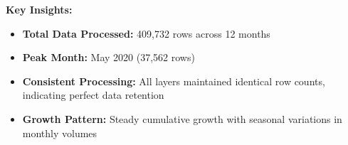 \textbf{Key Insights:}
\begin{itemize}
\item \textbf{Total Data Processed:} 409,732 rows across 12 months
\item \textbf{Peak Month:} May 2020 (37,562 rows)
\item \textbf{Consistent Processing:} All layers maintained identical row counts, indicating perfect data retention
\item \textbf{Growth Pattern:} Steady cumulative growth with seasonal variations in monthly volumes
\end{itemize}